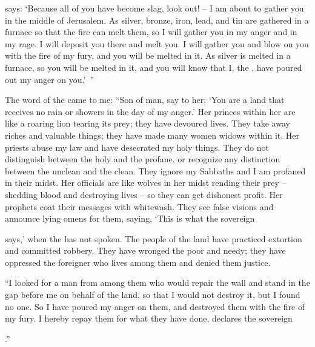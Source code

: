 {{}
says: ‘Because
all
of you have become
slag,
look out! – I am about to gather you in the middle of Jerusalem.
As silver,
bronze,
iron,
lead,
and tin
are gathered
in
a furnace
so that the fire
can melt
them, so
I will gather
you in my anger
and in my rage.
I will deposit
you there and melt you.
I will gather
you and blow
on
you with the fire
of my fury,
and you will be melted
in it.
As silver
is melted
in
a furnace,
so
you will be melted
in
it, and you will know
that
I,
the {},
have poured out
my anger
on you.’ ”
\par }{\PP {}The word
of the {}
came to me:
“Son
of man,
say
to her: ‘You
are a land
that receives no
rain or showers
in the day
of my anger.’
Her princes
within
her are like a roaring
lion
tearing
its prey;
they have devoured
lives.
They take
away riches
and valuable things;
they have made many
women widows
within it.
Her priests
abuse
my law
and have desecrated
my holy
things. They do not
distinguish
between
the holy
and the profane,
or
recognize
any distinction between
the unclean
and the clean.
They ignore
my Sabbaths
and I am profaned
in their midst.
Her officials
are like wolves
in her midst
rending
their prey
– shedding
blood
and destroying
lives
– so
they can get dishonest profit.
Her
prophets
coat
their messages with whitewash.
They see
false
visions
and announce lying omens
for them, saying,
‘This is what
the sovereign

{}
says,’ when the
{}
has not
spoken.
The people
of the land
have practiced extortion
and committed robbery.
They have wronged
the poor
and needy;
they have oppressed
the foreigner
who lives among them and denied
them justice.
\par }{\PP {}“I looked
for a man
from among them who would repair
the wall
and stand
in the gap
before
me on behalf
of the land,
so that I would not
destroy
it, but I found no one.
So I have poured
my anger
on
them,
and destroyed
them with the fire
of my fury.
I hereby
repay
them for what they have done, declares
the sovereign

{}.”

}
